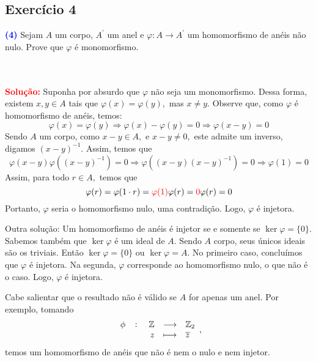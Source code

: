 \documentclass[11pt,a4paper]{article}
\newcommand{\exercicio}[1]{\subsection{Exercício #1} \textcolor{blue}{\bf(#1)}}
\newcommand{\solucao}[1]{
\textbf{\textcolor{white}{oi}\\ \\ \textcolor{red}{Solução:}} #1}
\begin{document}
\exercicio{4} Sejam $A$ um corpo, $A^{\prime}$ um anel e $\varphi \colon A \to A^{\prime}$ um homomorfismo de anéis não nulo. Prove que $\varphi$ é monomorfismo.
\solucao{
Suponha por absurdo que $\varphi$ não seja um monomorfismo. Dessa forma, existem $x, y \in A$ tais que $\varphi(x) = \varphi(y),$ mas $x \neq y.$ Observe que, como $\varphi$ é homomorfismo de anéis, temos:
\[
\varphi(x) = \varphi(y) \Rightarrow \varphi(x) - \varphi(y) = 0 \Rightarrow \varphi(x - y) = 0
\]
Sendo $A$ um corpo, como $x - y \in A,$ e $x - y \neq 0,$ este admite um inverso, digamos $(x-y)^{-1}.$ Assim, temos que
\[
\varphi(x-y)\varphi((x-y)^{-1}) = 0 \Rightarrow \varphi((x-y)(x-y)^{-1}) = 0 \Rightarrow \varphi(1) = 0
\]
Assim, para todo $r \in A,$ temos que
\[
\varphi(r) = \varphi(1 \cdot r) = \textcolor{red}{\varphi(1)} \varphi(r) = \textcolor{red}{0} \varphi(r) = 0
\]
Portanto, $\varphi$ seria o homomorfismo nulo, uma contradição. Logo,  $\varphi$ é injetora.

Outra solução: Um homomorfismo de anéis é injetor se e somente se $\ker \varphi = \{ 0 \}.$ Sabemos também que $\ker \varphi$ é um ideal de $A.$ Sendo $A$ corpo, seus únicos ideais são os triviais. Então $\ker \varphi = \{ 0 \}$ ou $\ker \varphi = A.$ No primeiro caso, concluímos que $\varphi$ é injetora. Na segunda, $\varphi$ corresponde ao homomorfismo nulo, o que não é o caso. Logo, $\varphi$ é injetora.

Cabe salientar que o resultado não é válido se $A$ for apenas um anel. Por exemplo, tomando
\[
\fullfunction{\phi}{\mathbb{Z}}{\mathbb{Z}_2}{z}{\overline{z}},
\]
temos um homomorfismo de anéis que não é nem o nulo e nem injetor.
}
\end{document}
